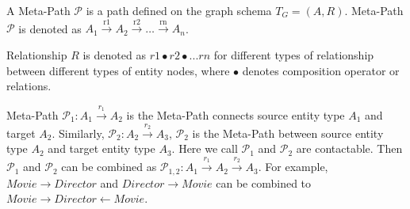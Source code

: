 \begin{definition}\label{def:metaPath}
A Meta-Path $\mathcal{P}$ is a path defined on the graph schema $T_G = (A, R)$. \newline
Meta-Path $\mathcal{P}$ is denoted as $A_1 \xrightarrow{\text{r1}} A_2 \xrightarrow{\text{r2}} \dots \xrightarrow{\text{rn}} A_n$. 

Relationship $R$ is denoted as $r1 \bullet r2 \bullet ... rn$ for different types of relationship between different types of entity nodes, where $\bullet $ denotes composition operator or relations.
\end{definition}

Meta-Path $\mathcal{P}_1: A_1 \xrightarrow{r_1} A_2$ is the Meta-Path connects source entity type $A_1$ and target $A_2$.
Similarly, $\mathcal{P}_2: A_2 \xrightarrow{r_2} A_3$, $\mathcal{P}_2$ is the Meta-Path between source entity type $A_\text{2}$ and target entity type $A_\text{3}$.
Here we call $\mathcal{P}_1$ and $\mathcal{P}_2$ are contactable. Then $\mathcal{P}_1$ and $\mathcal{P}_2$ can be combined as $\mathcal{P}_{1,2}: A_1 \xrightarrow{r_1} A_2 \xrightarrow{r_2} A_3$. For example, $Movie \rightarrow Director$ and $Director \rightarrow Movie$ can be combined to $Movie \rightarrow Director \leftarrow Movie$. 
